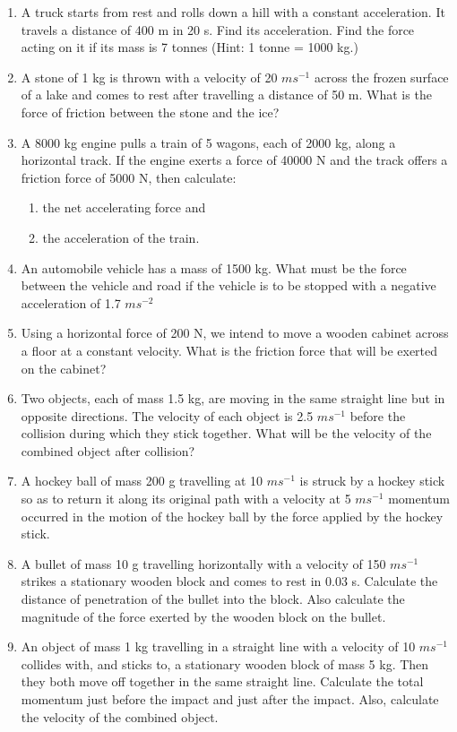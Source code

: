 \begin{enumerate}[label=\arabic*.,ref=\thesubsection.\theenumi]
\item A truck starts from rest and rolls down a hill with a constant acceleration. It travels a distance of 400 m in 20 s. Find its acceleration. Find the force acting on it if its mass is 7 tonnes (Hint: 1 tonne = 1000 kg.)
\item  A stone of 1 kg is thrown with a velocity of 20 $m s^{-1}$ across
the frozen surface of a lake and comes to rest after travelling a distance of 50 m. What is the force of friction between the stone and the ice?
\item  A 8000 kg engine pulls a train of 5 wagons, each of 2000 kg, along a horizontal track. If the engine exerts a force of 40000 N and the track offers a friction force of 5000 N, then calculate: 
\begin{enumerate} 
\item the net accelerating force and 
\item the acceleration of the train.
\end{enumerate}
\item  An automobile vehicle has a mass of 1500 kg. What must be the force between the vehicle and road if the vehicle is to
be stopped with a negative acceleration of 1.7 $m s^{-2}$ 
\item  Using a horizontal force of 200 N, we intend to move a wooden cabinet across a floor at a constant velocity. What is the friction force that will be exerted on the cabinet?
\item  Two objects, each of mass 1.5 kg, are moving in the same straight line but in opposite directions. The velocity of each object is 2.5 $m s^{-1}$
before the collision during which they stick together. What will be the velocity of the combined object after collision?
\item A hockey ball of mass 200 g travelling at 10 $m s^{-1}$ is struck by
a hockey stick so as to return it along its original path with a velocity at 5 $m s^{-1}$
momentum occurred in the motion of the hockey ball by the force applied by the hockey stick.
\item  A bullet of mass 10 g travelling horizontally with a velocity of 150 $m s^{-1}$
strikes a stationary wooden block and comes to rest in 0.03 s. Calculate the distance of penetration of the bullet into the block. Also calculate the magnitude of the force exerted by the wooden block on the bullet.
\item  An object of mass 1 kg travelling in a straight line with a velocity of 10 $m s^{-1}$
collides with, and sticks to, a stationary wooden block of mass 5 kg. Then they both move off together in the same straight line. Calculate the total momentum just before the impact and just after the impact. Also, calculate the velocity of the combined object.

\end{enumerate}
